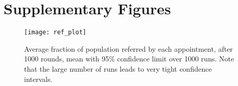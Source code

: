 
\section{Supplementary Figures}
\label{app:additional_figures}

\begin{figure}[H]
\texttt{[image: ref\_plot]}
\caption{Average fraction of population referred by each appointment, after 1000 rounds, mean with 95\% confidence limit over 1000 runs. Note that the large number of runs leads to very tight confidence intervals.\label{fig:ref_plot}}
\end{figure}